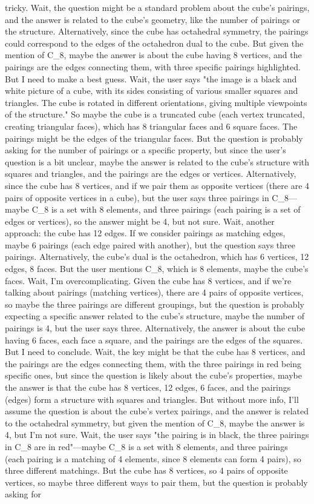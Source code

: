 tricky. Wait, the question might be a standard problem about the cube's pairings, and the answer is related to the cube's geometry, like the number of pairings or the structure. Alternatively, since the cube has octahedral symmetry, the pairings could correspond to the edges of the octahedron dual to the cube. But given the mention of C_8, maybe the answer is about the cube having 8 vertices, and the pairings are the edges connecting them, with three specific pairings highlighted. But I need to make a best guess. Wait, the user says "the image is a black and white picture of a cube, with its sides consisting of various smaller squares and triangles. The cube is rotated in different orientations, giving multiple viewpoints of the structure." So maybe the cube is a truncated cube (each vertex truncated, creating triangular faces), which has 8 triangular faces and 6 square faces. The pairings might be the edges of the triangular faces. But the question is probably asking for the number of pairings or a specific property, but since the user's question is a bit unclear, maybe the answer is related to the cube's structure with squares and triangles, and the pairings are the edges or vertices. Alternatively, since the cube has 8 vertices, and if we pair them as opposite vertices (there are 4 pairs of opposite vertices in a cube), but the user says three pairings in C_8—maybe C_8 is a set with 8 elements, and three pairings (each pairing is a set of edges or vertices), so the answer might be 4, but not sure. Wait, another approach: the cube has 12 edges. If we consider pairings as matching edges, maybe 6 pairings (each edge paired with another), but the question says three pairings. Alternatively, the cube's dual is the octahedron, which has 6 vertices, 12 edges, 8 faces. But the user mentions C_8, which is 8 elements, maybe the cube's faces. Wait, I'm overcomplicating. Given the cube has 8 vertices, and if we're talking about pairings (matching vertices), there are 4 pairs of opposite vertices, so maybe the three pairings are different groupings, but the question is probably expecting a specific answer related to the cube's structure, maybe the number of pairings is 4, but the user says three. Alternatively, the answer is about the cube having 6 faces, each face a square, and the pairings are the edges of the squares. But I need to conclude. Wait, the key might be that the cube has 8 vertices, and the pairings are the edges connecting them, with the three pairings in red being specific ones, but since the question is likely about the cube's properties, maybe the answer is that the cube has 8 vertices, 12 edges, 6 faces, and the pairings (edges) form a structure with squares and triangles. But without more info, I'll assume the question is about the cube's vertex pairings, and the answer is related to the octahedral symmetry, but given the mention of C_8, maybe the answer is 4, but I'm not sure. Wait, the user says "the pairing is in black, the three pairings in C_8 are in red"—maybe C_8 is a set with 8 elements, and three pairings (each pairing is a matching of 4 elements, since 8 elements can form 4 pairs), so three different matchings. But the cube has 8 vertices, so 4 pairs of opposite vertices, so maybe three different ways to pair them, but the question is probably asking for 